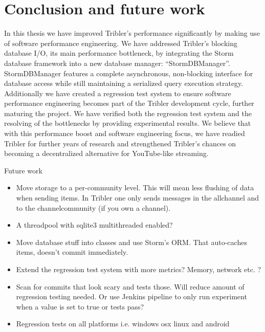 \chapter{Conclusion and future work}
\label{cpt:conclusion_and_future_work}

In this thesis we have improved Tribler's performance significantly by making use of software performance engineering.
We have addressed Tribler's blocking database I/O, its main performance bottleneck, by integrating the Storm database framework into a new database manager: \enquote{StormDBManager}.
StormDBManager features a complete asynchronous, non-blocking interface for database access while still maintaining a serialized query execution strategy.
Additionally we have created a regression test system to ensure software performance engineering becomes part of the Tribler development cycle, further maturing the project.
We have verified both the regression test system and the resolving of the bottlenecks by providing experimental results.
We believe that with this performance boost and software engineering focus, we have readied Tribler for further years of research and strengthened Tribler's chances on becoming a decentralized alternative for YouTube-like streaming.


Future work

\begin{itemize}
	\item Move storage to a per-community level. This will mean less flushing of data when sending items. In Tribler one only sends messages in the allchannel and to the channelcommunity (if you own a channel).
	\item A threadpool with sqlite3 multithreaded enabled? 
	\item Move database stuff into classes and use Storm's ORM. That auto-caches items, doesn't commit immediately.
	\item Extend the regression test system with more metrics? Memory, network etc. ?
	\item Scan for commits that look scary \cite{huang2014performance} and tests those. Will reduce amount of regression testing needed. Or use Jenkins pipeline to only run experiment when a value is set to true or tests pass?
	\item Regression tests on all platforms i.e. windows osx linux and android
\end{itemize}
